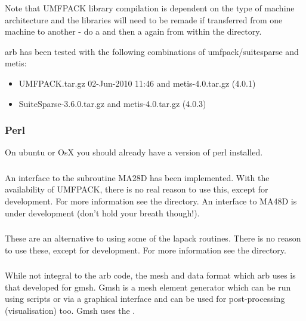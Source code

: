 Note that UMFPACK library compilation is dependent on the type of machine architecture and the libraries will need to be remade if transferred from one machine to another - do a  and then a  again from within the  directory.

arb has been tested with the following combinations of umfpack/suitesparse and metis:
%
\begin{itemize}
\item UMFPACK.tar.gz  02-Jun-2010 11:46 and metis-4.0.tar.gz (4.0.1)
\item SuiteSparse-3.6.0.tar.gz and metis-4.0.tar.gz (4.0.3)
\end{itemize}

\subsubsection{Perl}

On ubuntu or OsX you should already have a version of perl installed.

\subsubsection{ \label{sec:hsl}}

An interface to the subroutine MA28D has been implemented.  With the availability of UMFPACK, there is no real reason to use this, except for development.  For more information see the  directory.  An interface to MA48D is under development (don't hold your breath though!).

\subsubsection{}

These are an alternative to using some of the lapack routines.  There is no reason to use these, except for development.  For more information see the  directory.

\subsubsection{ \label{sec:gmsh}}

While not integral to the arb code, the mesh and data format which arb uses is that developed for gmsh.  Gmsh is a mesh element generator which can be run using scripts or via a graphical interface and can be used for post-processing (visualisation) too.  Gmsh uses the .

